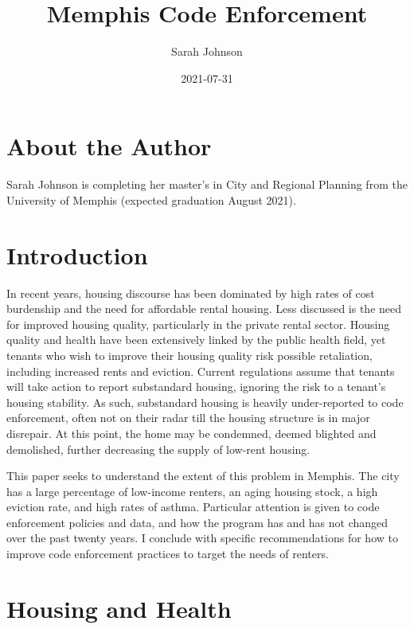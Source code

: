 \documentclass[
]{book}
\title{Memphis Code Enforcement}
\author{Sarah Johnson}
\date{2021-07-31}
\begin{document}
\maketitle

{
\setcounter{tocdepth}{1}
\tableofcontents
}
\hypertarget{about-the-author}{%
\chapter*{About the Author}\label{about-the-author}}

Sarah Johnson is completing her master's in City and Regional Planning from the University of Memphis (expected graduation August 2021).

\hypertarget{intro}{%
\chapter{Introduction}\label{intro}}

In recent years, housing discourse has been dominated by high rates of cost burdenship and the need for affordable rental housing. Less discussed is the need for improved housing quality, particularly in the private rental sector. Housing quality and health have been extensively linked by the public health field, yet tenants who wish to improve their housing quality risk possible retaliation, including increased rents and eviction. Current regulations assume that tenants will take action to report substandard housing, ignoring the risk to a tenant's housing stability. As such, substandard housing is heavily under-reported to code enforcement, often not on their radar till the housing structure is in major disrepair. At this point, the home may be condemned, deemed blighted and demolished, further decreasing the supply of low-rent housing.

This paper seeks to understand the extent of this problem in Memphis. The city has a large percentage of low-income renters, an aging housing stock, a high eviction rate, and high rates of asthma. Particular attention is given to code enforcement policies and data, and how the program has and has not changed over the past twenty years. I conclude with specific recommendations for how to improve code enforcement practices to target the needs of renters.

\hypertarget{housing-and-health}{%
\chapter{Housing and Health}\label{housing-and-health}}
\end{document}
